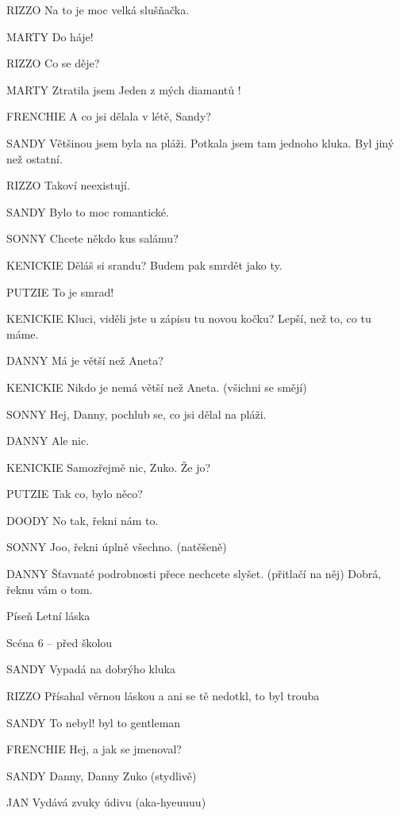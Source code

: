 RIZZO        Na to je moc velká slušňačka.

MARTY        Do háje!

RIZZO        Co se děje?

MARTY         Ztratila jsem Jeden z mých diamantů !

FRENCHIE         A co jsi dělala v létě, Sandy?

SANDY        Většinou jsem byla na pláži. Potkala jsem tam jednoho kluka. Byl jiný         než ostatní.

RIZZO        Takoví neexistují.

SANDY        Bylo to moc romantické.





SONNY        Chcete někdo kus salámu?

KENICKIE         Děláš si srandu? Budem pak smrdět jako ty.

PUTZIE         To je smrad!

KENICKIE        Kluci, viděli jste u zápisu tu novou kočku? Lepší, než to, co tu máme.

DANNY        Má je větší než Aneta?

KENICKIE        Nikdo je nemá větší než Aneta. (všichni se smějí)

SONNY        Hej, Danny,  pochlub se, co jsi dělal na pláži. 

DANNY        Ale nic. 

KENICKIE        Samozřejmě nic, Zuko. Že jo?

PUTZIE         Tak co, bylo něco?

DOODY        No tak, řekni nám to.

SONNY         Joo, řekni úplně všechno. (natěšeně)

DANNY        Šťavnaté podrobnosti přece nechcete slyšet. (přitlačí na něj) Dobrá,                 řeknu vám o tom.

Píseň Letní láska 

Scéna 6 – před školou 

SANDY                 Vypadá na dobrýho kluka

RIZZO        Přísahal věrnou láskou a ani se tě nedotkl, to byl trouba

SANDY        To nebyl! byl to gentleman

FRENCHIE        Hej, a jak se jmenoval?

SANDY        Danny, Danny Zuko (stydlivě)

JAN        Vydává zvuky údivu (aka-hyeuuuu)

